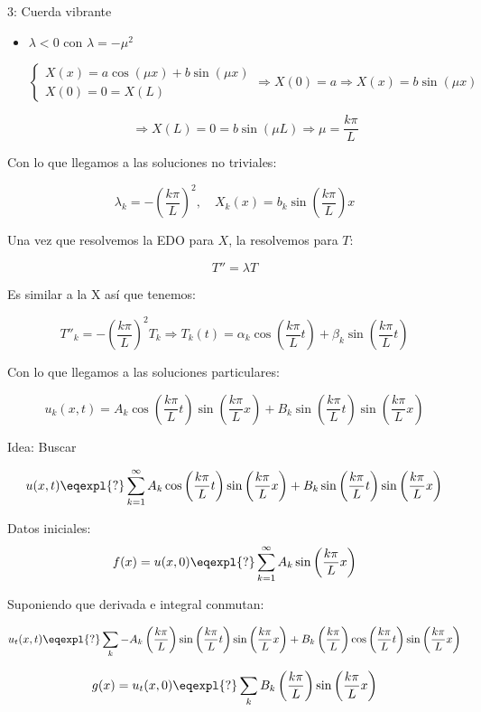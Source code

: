 \begin{example}{3: Cuerda vibrante}
\begin{itemize}
				\item $\lambda < 0$ con $\lambda = -\mu^2$

					\[
					\left\{
					\begin{array}{l}
					X(x) = a\cos(\mu x) + b\sin(\mu x) \\
					X(0) = 0 = X(L)
					\end{array}
					\right.
					\Rightarrow X(0) = a \Rightarrow X(x) = b \sin(\mu x)
					\]

					\[ \Rightarrow X(L) = 0 = b \sin (\mu L) \Rightarrow \mu = \frac{k \pi}{L}\]

			\end{itemize}

			Con lo que llegamos a las soluciones no triviales:

			\[\lambda_k = - (\frac{k\pi}{L})^2, \quad X_k(x) = b_k \sin \left(\frac{k\pi}{L} \right) x\]


			Una vez que resolvemos la EDO para $X$, la resolvemos para $T$:

			\[T'' = \lambda T\]

			Es similar a la X así que tenemos:

			\[T''_k = - (\frac{k\pi}{L})^2 T_k \Rightarrow T_k (t) = \alpha_k \cos\left( \frac{k \pi}{L} t \right) + \beta_k \sin \left( \frac{k \pi}{L}t \right)\]

			Con lo que llegamos a las soluciones particulares:

			\[u_k(x,t) = A_k \cos \left(\frac{k\pi}{L} t\right) \sin \left(\frac{k\pi}{L}x\right) + B_k \sin \left(\frac{k\pi}{L}t\right)  \sin \left(\frac{k\pi}{L}x\right) \]

			Idea: Buscar

			\[u(x,t) \eqexpl{?} \sum_{k=1}^{\infty} A_k \cos \left(\frac{k\pi}{L} t\right) \sin \left(\frac{k\pi}{L} x  \right)+ B_k \sin \left(\frac{k\pi}{L}t \right) \sin \left(\frac{k\pi}{L}  x \right)\]

			Datos iniciales:
			\[ f(x) = u(x,0) \eqexpl{?} \sum^{\infty}_{k=1} A_k \sin \left(\frac{k\pi}{L} x  \right)\]

			Suponiendo que derivada e integral conmutan:

			\[ u_t (x,t) \eqexpl{?} \sum_{k} - A_k \left(\frac{k\pi}{L} \right) \sin \left(\frac{k\pi}{L}t \right) \sin \left(\frac{k\pi}{L}x \right) + B_k \left(\frac{k\pi}{L} \right) \cos \left(\frac{k\pi}{L}t \right) \sin \left(\frac{k\pi}{L}x \right)
			\]

			\[g(x) = u_t(x,0) \eqexpl{?} \sum_k B_k  \left(\frac{k\pi}{L} \right) \sin \left(\frac{k\pi}{L}x \right)\]

		\end{example}


